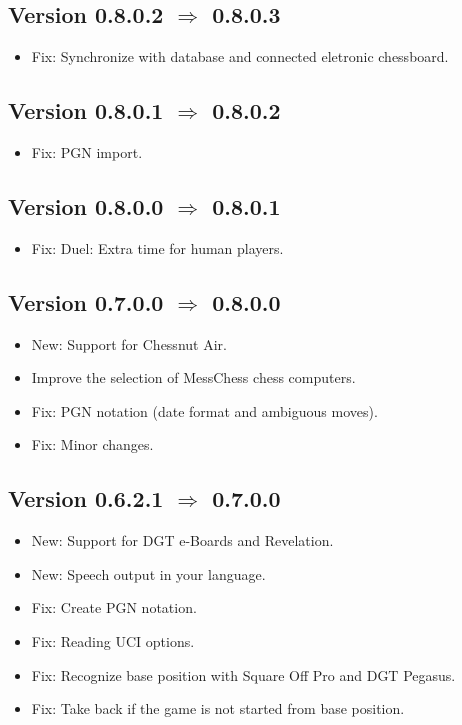 \documentclass[11pt,a4paper]{article}
\begin{document}
\subsection*{Version 0.8.0.2 $\Rightarrow$  0.8.0.3}
\begin{itemize}
	\item {\color{red}Fix}: Synchronize with database and connected eletronic chessboard.
\end{itemize}

\subsection*{Version 0.8.0.1 $\Rightarrow$  0.8.0.2}
\begin{itemize}
	\item {\color{red}Fix}: PGN import.
\end{itemize}

\subsection*{Version 0.8.0.0 $\Rightarrow$  0.8.0.1}
\begin{itemize}
	\item {\color{red}Fix}: Duel: Extra time for human players.
\end{itemize}

\subsection*{Version 0.7.0.0 $\Rightarrow$  0.8.0.0}
\begin{itemize}
	\item {\color{blue}New}: Support for Chessnut Air.
	\item Improve the selection of MessChess chess computers.
	\item {\color{red}Fix}: PGN notation (date format and ambiguous moves).
	\item {\color{red}Fix}: Minor changes.
\end{itemize}

\subsection*{Version 0.6.2.1 $\Rightarrow$  0.7.0.0}
\begin{itemize}
	\item {\color{blue}New}: Support for DGT e-Boards and Revelation.
	\item {\color{blue}New}: Speech output in your language.
	\item {\color{red}Fix}: Create PGN notation.
    \item {\color{red}Fix}: Reading UCI options.
	\item {\color{red}Fix}: Recognize base position with Square Off Pro and DGT Pegasus.
	\item {\color{red}Fix}: Take back if the game is not started from base position.
\end{itemize}
\end{document}
